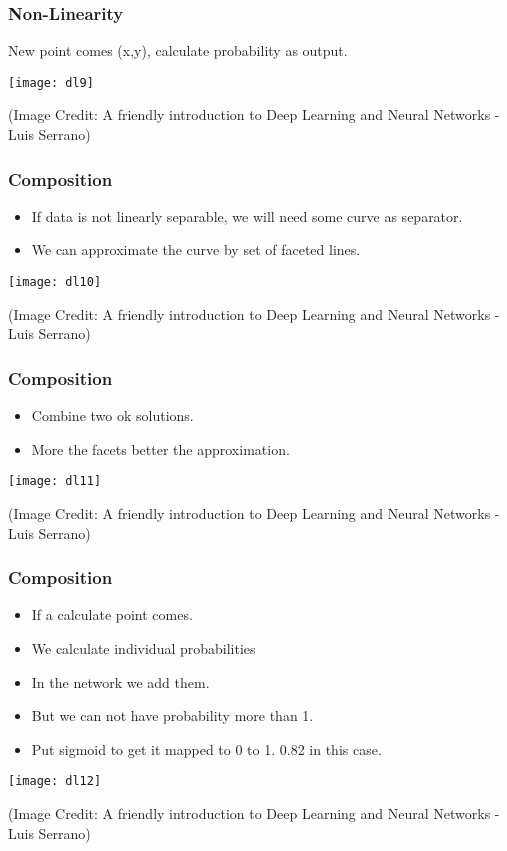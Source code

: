 \begin{frame}[fragile] \frametitle{Non-Linearity}
New point comes (x,y), calculate probability as output.
\begin{center}
\texttt{[image: dl9]}
\end{center}
{\tiny (Image Credit: A friendly introduction to Deep Learning and Neural Networks -  Luis Serrano)}
\end{frame}



\begin{frame}[fragile] \frametitle{Composition}
\begin{itemize}
\item If data is not linearly separable, we will need some curve as separator.
\item We can approximate the curve by set of faceted lines. 
\end{itemize}
\begin{center}
\texttt{[image: dl10]}
\end{center}
{\tiny (Image Credit: A friendly introduction to Deep Learning and Neural Networks -  Luis Serrano)}
\end{frame}

\begin{frame}[fragile] \frametitle{Composition}
\begin{itemize}
\item Combine two ok solutions.
\item More the facets better the approximation.
\end{itemize}
\begin{center}
\texttt{[image: dl11]}
\end{center}
{\tiny (Image Credit: A friendly introduction to Deep Learning and Neural Networks -  Luis Serrano)}
\end{frame}

\begin{frame}[fragile] \frametitle{Composition}
\begin{itemize}
\item If a calculate point comes.
\item We calculate individual probabilities
\item In the network we add them.
\item But we can not have probability more than 1.
\item Put sigmoid to get it mapped to 0 to 1. 0.82 in this case.
\end{itemize}
\begin{center}
\texttt{[image: dl12]}
\end{center}
{\tiny (Image Credit: A friendly introduction to Deep Learning and Neural Networks -  Luis Serrano)}
\end{frame}

